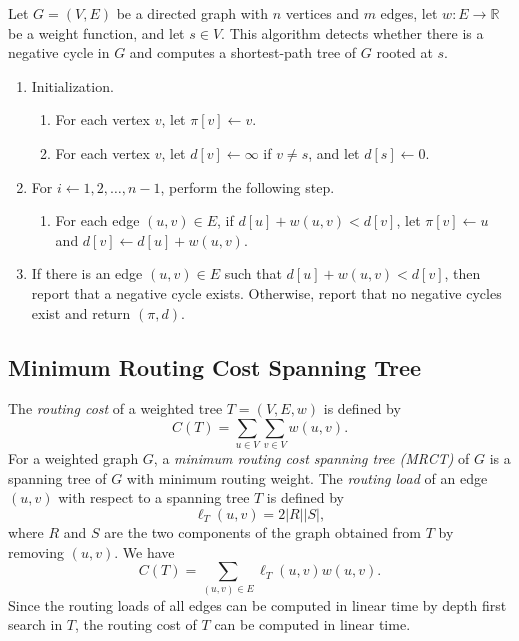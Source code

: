 \documentclass[11pt]{article}
\newcommand{\RR}{\mathbb{R}}
\begin{document}
\begin{algorithm}
  Let $G = (V, E)$ be a directed graph with $n$ vertices and $m$ edges, let $w: E \to \RR$ be a weight function, and let $s \in V$.
  This algorithm detects whether there is a negative cycle in $G$ and computes a shortest-path tree of $G$ rooted at $s$.
  \begin{enumerate}[label=\arabic*.]
    \item Initialization.
    \begin{enumerate}[label*=\arabic*.]
      \item For each vertex $v$, let $\pi[v] \gets v$.
      \item For each vertex $v$, let $d[v] \gets \infty$ if $v \neq s$, and let $d[s] \gets 0$.
    \end{enumerate}
    \item For $i \gets 1, 2, \dots, n - 1$, perform the following step.
    \begin{enumerate}[label*=\arabic*.]
      \item For each edge $(u, v) \in E$, if $d[u] + w(u, v) < d[v]$, let $\pi[v] \gets u$ and $d[v] \gets d[u] + w(u, v)$.
    \end{enumerate}
    \item If there is an edge $(u, v) \in E$ such that $d[u] + w(u, v) < d[v]$, then report that a negative cycle exists.
    Otherwise, report that no negative cycles exist and return $(\pi, d)$.
  \end{enumerate}
\end{algorithm}

\subsection{Minimum Routing Cost Spanning Tree}
The \emph{routing cost} of a weighted tree $T = (V, E, w)$ is defined by
\begin{equation*}
  C(T) = \sum_{u \in V} \sum_{v \in V} w(u, v).
\end{equation*}
For a weighted graph $G$, a \emph{minimum routing cost spanning tree (MRCT)} of $G$ is a spanning tree of $G$ with minimum routing weight.
The \emph{routing load} of an edge $(u, v)$ with respect to a spanning tree $T$ is defined by
\begin{equation*}
  \ell_T(u, v) = 2|R||S|,
\end{equation*}
where $R$ and $S$ are the two components of the graph obtained from $T$ by removing $(u, v)$.
We have
\begin{equation*}
  C(T) = \sum_{(u, v) \in E} \ell_T(u, v) w(u, v).
\end{equation*}
Since the routing loads of all edges can be computed in linear time by depth first search in $T$, the routing cost of $T$ can be computed in linear time.
\end{document}
